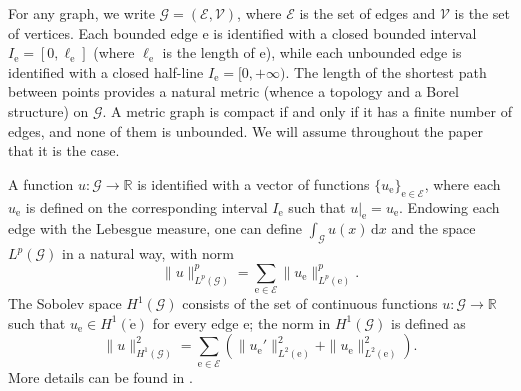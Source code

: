 \documentclass[10pt,a4paper]{article}
\theoremstyle{definition} \theoremstyle{remark}
\numberwithin{equation}{section}
\newcommand{\G}{\mathcal{G}}
\newcommand{\R}{\mathbb{R}}
\newcommand{\edge}{{\mathrm e}} %
\newcommand{\intd}{\,\mathrm{d}}
\newcommand{\intervalco}[1]{\mathopen[#1\mathclose)}
\begin{document}
For any graph, we write
$\G = (\mathcal{E}, \mathcal{V})$, where $\mathcal{E}$ is the set of
edges and $\mathcal{V}$ is the set of vertices. Each bounded edge
$\edge$ is identified with a closed bounded interval $I_\edge = [0,\ell_\edge]$ (where $\ell_\edge$ is the length of $\edge$), while each unbounded edge is identified with a closed half-line $I_\edge = \intervalco{0,+\infty}$. The length of the shortest path between points provides a natural metric (whence a topology and a Borel structure) on $\G$. A metric graph is compact if and only if it has a finite number of edges, and none of them is unbounded. We will assume throughout the paper that it is the case.

A function $u: \G \to \R$ is identified with a vector of functions $\{u_{\edge}\}_{\edge \in \mathcal{E}}$, where each $u_{\edge}$ is defined on the corresponding interval $I_\edge$ such that $u|_{\edge}=u_{\edge}$.  Endowing each edge with the Lebesgue measure, one can define $\int_\G u(x) \intd x$ and the space $L^p(\G)$ in a natural way, with norm
\begin{equation*}
  \|u\|_{L^p(\G)}^p
  = \sum_{\edge \in \mathcal{E}} \|u_\edge\|_{L^p(\edge)}^p.    
\end{equation*}
The Sobolev space $H^1(\G)$ consists of the set of continuous
functions $u: \G \to \R$ such that
$u_{\edge} \in H^1(\mathring{\edge})$ for every edge
$\edge$; the norm
in $H^1(\G)$ is defined as
\begin{equation*}
  \|u\|_{H^1(\G)}^2
  = \sum_{\edge \in \mathcal{E}} \left(\|u_{\edge}'\|_{L^2(\edge)}^2 + \|u_{\edge}\|_{L^2(\edge)}^2\right).
\end{equation*}
More details can be found in \cite{AST, AST2, BK}.
\end{document}
